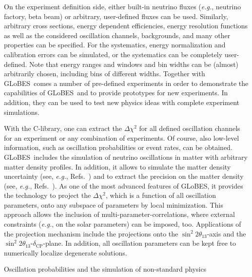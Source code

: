 \documentclass[12pt,a4paper]{article}
\makeatletter
\renewcommand{\section}{\@startsection{section}{1}{0em}{-\baselineskip}%
{\baselineskip}{\normalfont\large\bfseries}}
\newcommand{\eg}{{\it e.g.}}
\newcommand{\Refs}{Refs.}
\newcommand{\deltacp}{\delta_{\mathrm{CP}}}
\newcommand{\stheta}{\sin^2 2 \theta_{13}}
\newcommand{\GLOBES}{{\sf GLoBES}}
\makeatother
\begin{document}
On the experiment definition side, either built-in neutrino fluxes
(\eg, neutrino factory, beta beam) or arbitrary, user-defined fluxes can be used. 
Similarly,
arbitrary cross sections, energy dependent efficiencies,
energy resolution functions as well as the considered oscillation channels, 
backgrounds, and many other properties can be specified. 
For the systematics, energy
normalization and calibration errors can be simulated, or the
systematics can be completely user-defined. Note that
energy ranges and windows and bin widths can be
(almost) arbitrarily chosen, including bins of different
widths. Together with \GLOBES\ comes a number of
pre-defined experiments in order to demonstrate the capabilities
of \GLOBES\ and to provide prototypes for new experiments.
In addition, they can be used to test new physics ideas with
complete experiment simulations.

With the C-library, one can extract the $\Delta \chi^2$ for all defined 
oscillation channels for an experiment or any combination of experiments.
Of course, also low-level information, such as oscillation
probabilities or event rates, can be obtained. \GLOBES\ includes the
simulation of neutrino oscillations in matter with arbitrary matter 
density profiles. In addition, it allows to simulate the matter density
uncertainty (see, \eg, \Refs~\cite{Huber:2002mx,Ohlsson:2003ip}) and to 
extract the precision on the matter density (see, \eg, \Refs~\cite{Winter:2005we,Gandhi:2006gu}).
 As one of the most
advanced features of \GLOBES , it provides the technology to 
project the $\Delta \chi^2$, which is a function of all oscillation
parameters, onto any subspace of parameters by local minimization. 
This approach allows the inclusion of multi-parameter-correlations,
where external constraints (\eg, on the solar parameters) can be imposed, too.
Applications of the projection mechanism include the projections onto 
the $\stheta$-axis and the $\stheta$-$\deltacp$-plane. In addition, 
all oscillation parameters can be kept free to numerically localize 
degenerate solutions.

\section{Oscillation probabilities and the simulation of non-standard physics}
\end{document}

